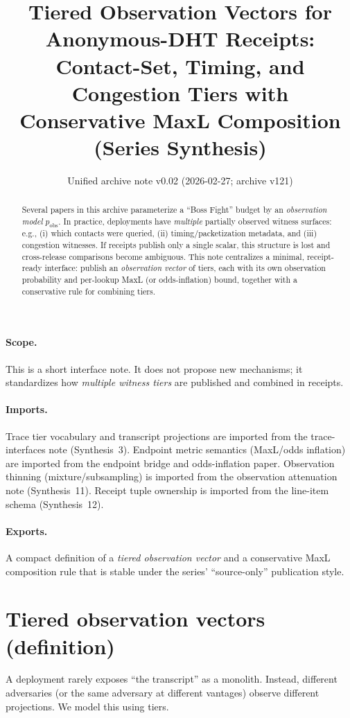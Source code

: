 \documentclass[11pt]{article}
\title{Tiered Observation Vectors for Anonymous-DHT Receipts:\\
\large Contact-Set, Timing, and Congestion Tiers with Conservative MaxL Composition (Series Synthesis)}
\author{}
\date{Unified archive note v0.02 (2026-02-27; archive v121)}
\theoremstyle{definition}
\begin{document}
\maketitle

\begin{abstract}
Several papers in this archive parameterize a ``Boss Fight'' budget by an \emph{observation model} $p_{\mathrm{obs}}$.
In practice, deployments have \emph{multiple} partially observed witness surfaces: e.g., (i) which contacts were queried, (ii) timing/packetization metadata, and (iii) congestion witnesses.
If receipts publish only a single scalar, this structure is lost and cross-release comparisons become ambiguous.
This note centralizes a minimal, receipt-ready interface: publish an \emph{observation vector} of tiers, each with its own observation probability and per-lookup MaxL (or odds-inflation) bound, together with a conservative rule for combining tiers.
\end{abstract}

\paragraph{Scope.}
This is a short interface note.
It does not propose new mechanisms; it standardizes how \emph{multiple witness tiers} are published and combined in receipts.

\paragraph{Imports.}
Trace tier vocabulary and transcript projections are imported from the trace-interfaces note (Synthesis~3).\cite{series:traceifaces}
Endpoint metric semantics (MaxL/odds inflation) are imported from the endpoint bridge and odds-inflation paper.\cite{series:endpointbridge,series:oddsinflation}
Observation thinning (mixture/subsampling) is imported from the observation attenuation note (Synthesis~11).\cite{series:obsatten}
Receipt tuple ownership is imported from the line-item schema (Synthesis~12).\cite{series:receiptitems}

\paragraph{Exports.}
A compact definition of a \emph{tiered observation vector} and a conservative MaxL composition rule that is stable under the series' ``source-only'' publication style.

\section{Tiered observation vectors (definition)}
A deployment rarely exposes ``the transcript'' as a monolith.
Instead, different adversaries (or the same adversary at different vantages) observe different projections.
We model this using tiers.
\end{document}
